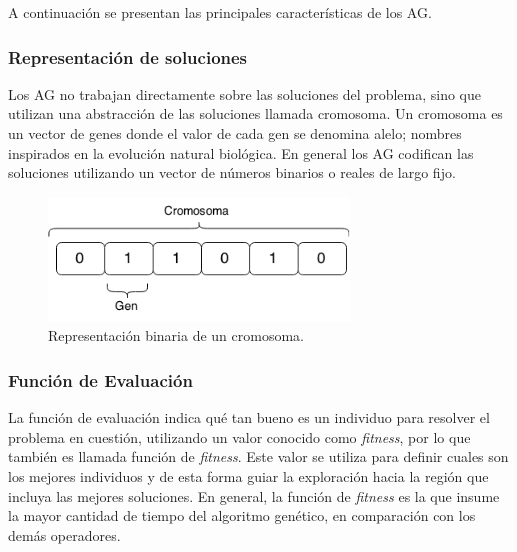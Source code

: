 A continuación se presentan las principales características de los AG.




\subsubsection{Representación de soluciones}
Los AG no trabajan directamente sobre las soluciones del problema, sino que utilizan una abstracción de las soluciones llamada cromosoma. Un cromosoma es un vector de genes donde el valor de cada gen se denomina alelo; nombres inspirados en la evolución natural biológica.
En general los AG codifican las soluciones utilizando un vector de números binarios o reales de largo fijo.

\begin{figure}[ht]
	\centering
	\includegraphics[width=8cm]{Figures/rep_binaria}
	\caption{Representación binaria de un cromosoma.}
	\label{fig:rep_binaria}
\end{figure}


\subsubsection{Función de Evaluación} 
La función de evaluación indica qué tan bueno es un individuo para resolver el problema en cuestión, utilizando un valor conocido como \emph{fitness}, por lo que también es llamada función de \emph{fitness}. Este valor se utiliza para definir cuales son los mejores individuos y de esta forma guiar la exploración hacia la región que incluya las mejores soluciones. En general, la función de \emph{fitness} es la que insume la mayor cantidad de tiempo del algoritmo genético, en comparación con los demás operadores.

